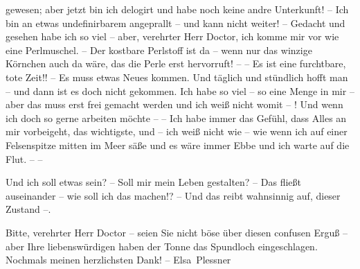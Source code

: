                gewesen; aber jetzt bin ich delogirt und habe noch keine andre Unterkunft! – Ich bin
               an etwas undefinirbarem angeprallt – und kann nicht weiter! – Gedacht und gesehen
               habe ich so viel – aber, verehrter Herr Doctor, ich komme mir vor wie eine
               Perlmuschel. – Der kostbare Perlstoff ist da – wenn nur das winzige Körnchen auch da
               wäre, das die Perle erst hervorruft! – – Es ist eine furchtbare, tote Zeit!! – Es
               muss etwas Neues kommen. Und täglich und stündlich hofft man – und dann ist es doch
               nicht gekommen. Ich habe so viel – so eine Menge in mir – aber das muss erst frei
               gemacht werden und ich weiß nicht womit – ! Und wenn ich doch so gerne arbeiten
               möchte – – Ich habe immer das Gefühl, dass Alles an mir vorbeigeht, das wichtigste,
               und – ich weiß nicht wie – wie wenn ich auf einer Felsenspitze mitten im Meer säße
               und es wäre immer Ebbe und ich warte auf die Flut. – –\pend
           
\pstart
           Und ich soll etwas sein? – Soll mir mein Leben gestalten? – Das fließt auseinander –
               wie soll ich das machen!? – Und das reibt wahnsinnig auf, dieser Zustand –.\pend
           
\pstart
           Bitte, verehrter Herr Doctor – seien Sie nicht böse über diesen confusen Erguß – aber
               Ihre liebenswürdigen \label{K_L03712-1v}\label{K_L03712-1} haben der Tonne
               das Spundloch eingeschlagen. Nochmals meinen herzlichsten Dank! –\pend
           \pstart \spacefill\mbox{Elsa Plessner}\pend{}\endnumbering{}
\begin{anhang}
\end{anhang}
      